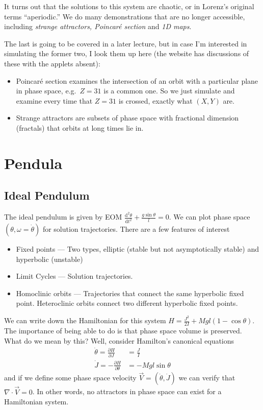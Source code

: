 \documentclass[10pt]{article}
\newcommand{\pd}[2]{\frac{\partial#1}{\partial#2}}
\newcommand{\rtd}[2]{\frac{\mathrm{d}^2#1}{\mathrm{d}#2^2}}
\begin{document}
It turns out that the solutions to this system are chaotic, or in Lorenz's
original terms ``aperiodic.'' We do many demonstrations that are no longer
accessible, including \emph{strange attractors, Poincar\'e section} and
\emph{1D maps}.

The last is going to be covered in a later lecture, but in case I'm interested
in simulating the former two, I look them up here (the website has discussions
of these with the applets absent):
\begin{itemize}
    \item Poincar\'e section examines the intersection of an orbit with a
        particular plane in phase space, e.g.\ $Z=31$ is a common one. So we
        just simulate and examine every time that $Z=31$ is crossed, exactly
        what $(X,Y)$ are.
    \item Strange attractors are subsets of phase space with fractional
        dimension (fractals) that orbits at long times lie in.
\end{itemize}

\clearpage

\section{Pendula}

\subsection{Ideal Pendulum}

The ideal pendulum is given by EOM $\rtd{\theta}{t} + \frac{g\sin\theta}{l} =
0$. We can plot phase space $(\theta, \omega = \dot{\theta})$ for solution
trajectories. There are a few features of interest
\begin{itemize}
    \item Fixed points --- Two types, elliptic (stable but not asymptotically
        stable) and hyperbolic (unstable)
    \item Limit Cycles --- Solution trajectories.
    \item Homoclinic orbits --- Trajectories that connect the same hyperbolic
        fixed point. Heteroclinic orbits connect two different hyperbolic fixed
        points.
\end{itemize}

We can write down the Hamiltonian for this system $H = \frac{J^2}{2I} +
Mgl(1-\cos\theta)$. The importance of being able to do is that phase space
volume is preserved. What do we mean by this? Well, consider Hamilton's
canonical equations
\begin{align}
    \dot{\theta} = \pd{H}{J} &= \frac{J}{I} \nonumber\\
    \dot{J} = -\pd{H}{\theta} &= -Mgl\sin\theta
\end{align}
and if we define some phase space velocity $\vec{V} = \left( \dot{\theta},
\dot{J} \right)$ we can verify that $\nabla \cdot \vec{V} = 0$. In other words,
no attractors in phase space can exist for a Hamiltonian system.
\end{document}
